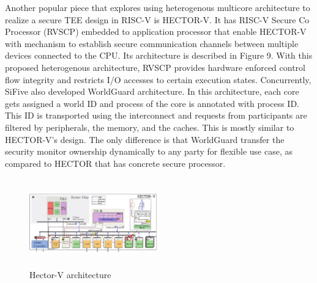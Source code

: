 \documentclass[a4paper,fleqn]{cas-dc}
\begin{document}
Another popular piece that explores using heterogenous multicore architecture to realize a secure TEE design in RISC-V is HECTOR-V. It has RISC-V Secure Co Processor (RVSCP) embedded to application processor that enable HECTOR-V with mechanism to establish secure communication channels between multiple devices connected to the CPU. Its architecture is described in Figure 9. With this proposed heterogenous architecture, RVSCP provides hardware enforced control flow integrity and restricts I/O accesses to certain execution states. Concurrently, SiFive also developed WorldGuard architecture. In this architecture, each core gets assigned a world ID and process of the core is annotated with process ID. This ID is transported using the interconnect and requests from participants are filtered by peripherals, the memory, and the caches. This is mostly similar to HECTOR-V’s design. The only difference is that WorldGuard transfer the security monitor ownership dynamically to any party for flexible use case, as compared to HECTOR that has concrete secure processor.

\begin{figure}[hbt!]
	\centering
	\includegraphics[width=0.5\textwidth,height=1.5in]{figs/Hector.JPG}
	\caption{Hector-V architecture}
\end{figure}
\end{document}
